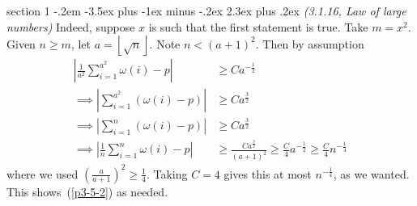 \documentclass[12pt]{article}
\makeatletter
\theoremstyle{norm}
\newcommand{\rc}[1]{\frac{1}{#1}}
\newcommand{\be}[0]{\beta}
\newcommand{\om}[0]{\omega}
\newcommand{\ab}[1]{\left| {#1} \right|}
\newcommand{\pa}[1]{\left( {#1} \right)}
\newcommand{\fl}[1]{\left\lfloor {#1}\right\rfloor}
\newcommand{\pf}[2]{\pa{\frac{#1}{#2}}}
\newenvironment{problem}{\@startsection
       {section}
       {1}
       {-.2em}
       {-3.5ex plus -1ex minus -.2ex}
       {2.3ex plus .2ex}
       {\pagebreak[3]%
       \large\bf\noindent{Problem }
       }
       }
       {%
       }
\makeatother
\begin{document}
\begin{problem}{\it(3.1.16, Law of large numbers)}
Indeed, suppose $x$ is such that the first statement is true. %
Take $m=x^2$. Given $n\ge m$, let $a=\fl{\sqrt n}$. %
Note $n<(a+1)^2$. 
Then by assumption
\begin{align*}
\ab{\rc{a^2}\sum_{i=1}^{a^2} \om(i)-p}&\ge Ca^{-\rc 2}\\
\implies \ab{\sum_{i=1}^{a^2} (\om(i)-p)}&\ge Ca^{\frac 32}\\
\implies \ab{\sum_{i=1}^n (\om(i)-p)}&\ge Ca^{\frac 32}\\
\implies \ab{\rc{n}\sum_{i=1}^n \om(i)-p}&\ge \frac{Ca^{\frac 32}}{(a+1)^2}\geq \frac{C}{4}a^{-\rc2}\ge \frac C4 n^{-\rc4}
\end{align*}
where we used $\pf{a}{a+1}^2\geq \rc 4$. Taking $C=4$ gives this at most $n^{-\rc 4}$, as we wanted. This shows~(\ref{p3-5-2})
as needed.
\end{problem}
\end{document}
